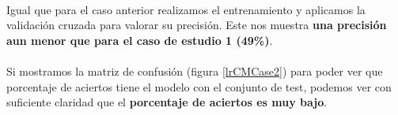 \paragraph{}
Igual que para el caso anterior realizamos el entrenamiento y aplicamos la validación cruzada para valorar su precisión. Este nos muestra \textbf{una precisión aun menor que para el caso de estudio 1 (49\%)}.

\paragraph{}
Si mostramos la matriz de confusión\cite{ref:confusion_matrix} (figura \ref{lrCMCase2}) para poder ver que porcentaje de aciertos tiene el modelo con el conjunto de test, podemos ver con suficiente claridad que el \textbf{porcentaje de aciertos es muy bajo}.

